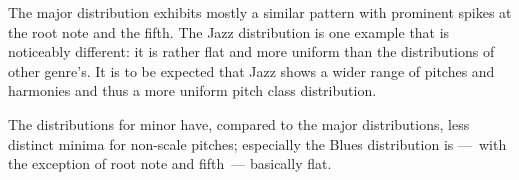 \documentclass{article}
\begin{document}
The major distribution exhibits mostly a similar pattern with prominent spikes at the root note and the fifth. The Jazz distribution is one example that is noticeably different: it is rather flat and more uniform than the distributions of other genre's. It is to be expected that Jazz shows a wider range of pitches and harmonies and thus a more uniform pitch class distribution.

The distributions for minor have, compared to the major distributions, less distinct minima for non-scale pitches; especially the Blues distribution is ---~with the exception of root note and fifth~--- basically flat.

\begin{table}[H]
\centering
{}
\end{table}
\end{document}
